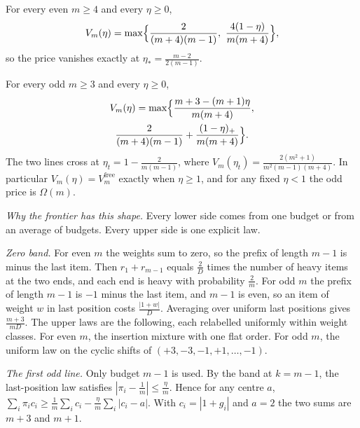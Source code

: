 
\begin{theorem}
\label{thm:even}
For every even $m\ge4$ and every $\eta\ge0$,
\[
V_{m}(\eta)=\max\Bigl\{\frac{2}{(m+4)(m-1)},\ \frac{4(1-\eta)}{m(m+4)}\Bigr\},
\]
so the price vanishes exactly at $\eta_{*}=\frac{m-2}{2(m-1)}$.
\end{theorem}


\begin{theorem}
\label{thm:odd}
For every odd $m\ge3$ and every $\eta\ge0$,
\begin{multline*}
V_{m}(\eta)=\max\Bigl\{\frac{m+3-(m+1)\eta}{m(m+4)},\\
\frac{2}{(m+4)(m-1)}+\frac{(1-\eta)_{+}}{m(m+4)}\Bigr\}.
\end{multline*}
The two lines cross at $\eta_{t}=1-\frac{2}{m(m-1)}$, where
$V_{m}(\eta_{t})=\frac{2(m^{2}+1)}{m^{2}(m-1)(m+4)}$. In particular
$V_{m}(\eta)=V^{\mathrm{free}}_{m}$ exactly when $\eta\ge1$, and for any fixed $\eta<1$ the
odd price is $\Omega(m)$.
\end{theorem}


\emph{Why the frontier has this shape.} Every lower side comes from one budget or from an
average of budgets. Every upper side is one explicit law.

\emph{Zero band.} For even $m$ the weights sum to zero, so the prefix of length $m-1$ is minus
the last item. Then $r_{1}+r_{m-1}$ equals $\frac{2}{D}$ times the number of heavy items at
the two ends, and each end is heavy with probability $\frac{2}{m}$. For odd $m$ the prefix
of length $m-1$ is $-1$ minus the last item, and $m-1$ is even, so an item of weight $w$ in
last position costs $\frac{|1+w|}{D}$. Averaging over uniform last positions gives
$\frac{m+3}{mD}$. The upper laws are the following, each relabelled uniformly within weight
classes. For even $m$, the insertion mixture with one flat order. For odd $m$, the uniform
law on the cyclic shifts of $(+3,-3,-1,+1,\dots,-1)$.

\emph{The first odd line.} Only budget $m-1$ is used. By the band at $k=m-1$, the
last-position law satisfies $|\pi_{i}-\frac1m|\le\frac{\eta}{m}$. Hence for any centre $a$,
$\sum_{i}\pi_{i}c_{i}\ge\frac1m\sum_{i}c_{i}-\frac{\eta}{m}\sum_{i}|c_{i}-a|$. With
$c_{i}=|1+g_{i}|$ and $a=2$ the two sums are $m+3$ and $m+1$.


